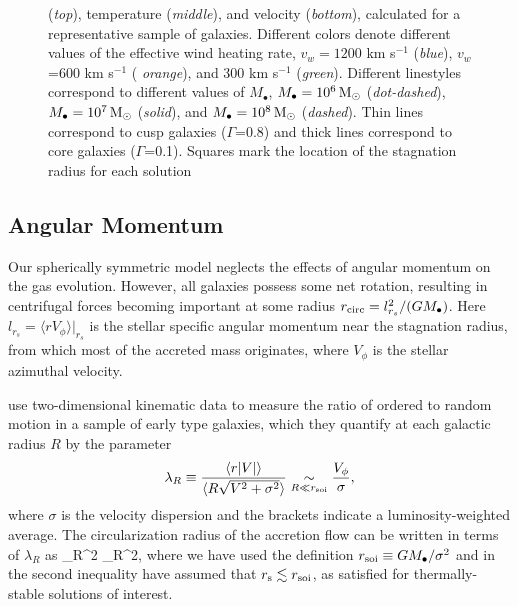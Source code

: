 \documentclass[usenatbib,fleqn]{mn2e}
\newcommand{\Mbh}[1][]{M_{\bullet#1}}
\newcommand{\vwO}{v_{w}}
\begin{document}
\begin{figure}
{    ({\it top}), temperature ({\it middle}), and velocity ({\it bottom}),
    calculated for a representative sample of galaxies.  Different colors
    denote different values of the effective wind heating rate,
    $\vwO=1200$ km s$^{-1}$ ({\it blue}), $\vwO$=600 km s$^{-1}$ ({\it
      orange}), and 300 km s$^{-1}$ ({\it green}).  Different
    linestyles correspond to different values of $\Mbh$, $\Mbh=10^6
    \Msun$ ({\it dot-dashed}), $\Mbh=10^7 \Msun$ ({\it solid}), and
    $\Mbh=10^8 \Msun$ ({\it dashed}). Thin lines correspond to cusp
    galaxies ($\Gamma$=0.8) and thick lines correspond to core
    galaxies ($\Gamma$=0.1). Squares mark the location of
    the stagnation radius for each solution
 }
\end{figure}

  \subsection{Angular Momentum}
  \label{sec:ang}

Our spherically symmetric model neglects the effects of angular momentum on the gas evolution.  However, all galaxies possess some net rotation, resulting in centrifugal forces becoming important at some radius $r_{\rm circ} = l^{2}_{r_{s}}/(GM_{\bullet})$.  Here $l_{r_{s}} = \langle r V_{\phi}\rangle |_{r_s}$ is the stellar specific angular momentum near the stagnation radius, from which most of the accreted mass originates, where $V_{\phi}$ is the stellar azimuthal velocity.    

\citet{EmsellemCappellari+:2007a} use two-dimensional kinematic data to measure the ratio of ordered to random motion in a sample of early type galaxies, which they quantify at each galactic radius $R$ by the parameter
  \begin{align}
    \lambda_R \equiv \frac{\langle r|V|\rangle}{\langle R\sqrt{V^2+\sigma^2}\rangle} \underset{R \ll r_{\rm soi}}\sim \frac{V_{\phi}}{\sigma},
  \end{align}
where $\sigma$ is the velocity dispersion and the brackets indicate a luminosity-weighted average.  The circularization radius of the accretion flow can be written in terms of $\lambda_R$ as
\be
{} \approx {}\lambda_{R}^{2} \lesssim \lambda_{R}^{2},
\label{eq:rcirc}
\ee
where we have used the definition $r_{\rm soi} \equiv GM_{\bullet}/\sigma^{2}$ and in the second inequality have assumed that $r_{\rm s} \lesssim r_{\rm soi}$, as satisfied for thermally-stable solutions of interest.
\end{document}
